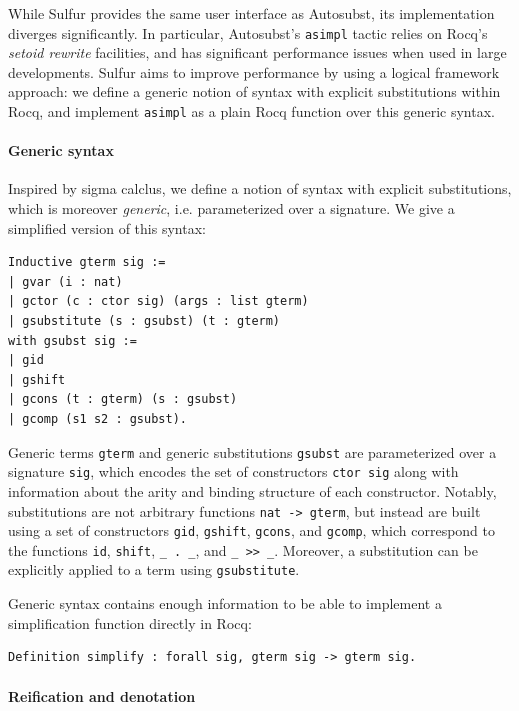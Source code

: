 \documentclass[sigplan,review,anonymous]{acmart}
\newcommand{\coq}[1]{\texttt{#1}}
\begin{document}
While Sulfur provides the same user interface as Autosubst,
its implementation diverges significantly. In particular, Autosubst's
\coq{asimpl} tactic relies on Rocq's \textit{setoid rewrite}
facilities, and has significant
performance issues when used in large developments.
Sulfur aims to improve performance by using a logical framework approach:
we define a generic notion of syntax with explicit substitutions
within Rocq, and implement \coq{asimpl} as a plain Rocq function over
this generic syntax.

\paragraph{Generic syntax}


Inspired by sigma calclus, we define a notion of syntax with explicit
substitutions, which is moreover \textit{generic}, i.e. parameterized over
a signature. We give a simplified version of this syntax:
\begin{verbatim}
Inductive gterm sig :=
| gvar (i : nat)
| gctor (c : ctor sig) (args : list gterm)
| gsubstitute (s : gsubst) (t : gterm)
with gsubst sig :=
| gid
| gshift
| gcons (t : gterm) (s : gsubst)
| gcomp (s1 s2 : gsubst).
\end{verbatim}

Generic terms \coq{gterm} and generic substitutions \coq{gsubst} are
parameterized
over a signature \coq{sig}, which encodes the set of constructors
\coq{ctor sig}
along with information about the arity and binding structure of each
constructor. Notably, substitutions are not arbitrary functions
\coq{nat -> gterm},
but instead are built using a set of constructors \coq{gid},
\coq{gshift}, \coq{gcons}, and \coq{gcomp}, which correspond to
the functions \coq{id}, \coq{shift}, \coq{_ . _}, and \coq{_ >> _}.
Moreover, a substitution can be explicitly applied to a term using
\coq{gsubstitute}.

Generic syntax contains enough information to be able
to implement a simplification function directly in Rocq:
\begin{verbatim}
Definition simplify : forall sig, gterm sig -> gterm sig.
\end{verbatim}

\paragraph{Reification and denotation}
\end{document}
